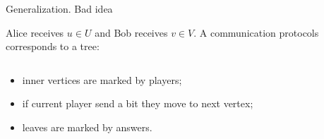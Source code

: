 \begin{frame}{Generalization. Bad idea}

    Alice receives $u \in U$ and Bob receives $v \in V$. A communication protocols corresponds to a tree:

    \begin{columns}[t]
		\begin{column}{0.7\textwidth}
            \begin{itemize}
                \item<2-> inner vertices are marked by players;
	            \item<3-> if current player send a bit they move to next vertex;
    		    \item<8-> leaves are marked by answers.
	        \end{itemize}



        \end{column}
        
		\begin{column}{0.25\textwidth}
            
		\end{column}
	\end{columns}

\end{frame}

